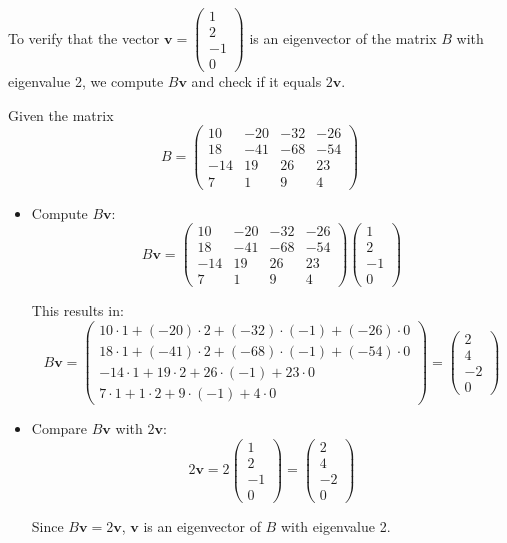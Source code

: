 \documentclass{article}
\begin{document}
To verify that the vector \(\mathbf{v} = \begin{pmatrix} 1 \\ 2 \\ -1 \\ 0 \end{pmatrix}\) is an eigenvector of the matrix \(B\) with eigenvalue 2, we compute \(B\mathbf{v}\) and check if it equals \(2\mathbf{v}\).

Given the matrix
\[
    B = \begin{pmatrix} 10 & -20 & -32 & -26 \\ 18 & -41 & -68 & -54 \\ -14 & 19 & 26 & 23 \\ 7 & 1 & 9 & 4 \end{pmatrix}
\]

\begin{itemize}
    \item Compute \( B\mathbf{v} \):
          \[
              B\mathbf{v} = \begin{pmatrix} 10 & -20 & -32 & -26 \\ 18 & -41 & -68 & -54 \\ -14 & 19 & 26 & 23 \\ 7 & 1 & 9 & 4 \end{pmatrix} \begin{pmatrix} 1 \\ 2 \\ -1 \\ 0 \end{pmatrix}
          \]

          This results in:
          \[
              B\mathbf{v} = \begin{pmatrix} 10 \cdot 1 + (-20) \cdot 2 + (-32) \cdot (-1) + (-26) \cdot 0 \\ 18 \cdot 1 + (-41) \cdot 2 + (-68) \cdot (-1) + (-54) \cdot 0 \\ -14 \cdot 1 + 19 \cdot 2 + 26 \cdot (-1) + 23 \cdot 0 \\ 7 \cdot 1 + 1 \cdot 2 + 9 \cdot (-1) + 4 \cdot 0 \end{pmatrix} = \begin{pmatrix} 2 \\ 4 \\ -2 \\ 0 \end{pmatrix}
          \]

    \item Compare \(B\mathbf{v}\) with \(2\mathbf{v}\):
          \[
              2\mathbf{v} = 2 \begin{pmatrix} 1 \\ 2 \\ -1 \\ 0 \end{pmatrix} = \begin{pmatrix} 2 \\ 4 \\ -2 \\ 0 \end{pmatrix}
          \]

          Since \(B\mathbf{v} = 2\mathbf{v}\), \(\mathbf{v}\) is an eigenvector of \(B\) with eigenvalue 2.
\end{itemize}
\end{document}
